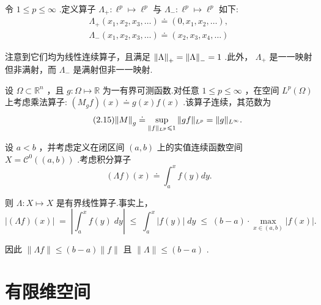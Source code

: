 \begin{instance}
    令 $1 \leq  p \leq  \infty$ .定义算子 ${\Lambda }_{ + } : {\ell }^{p} \mapsto  {\ell }^{p}$ 与 ${\Lambda }_{ - } : {\ell }^{p} \mapsto  {\ell }^{p}$ 如下:
    \begin{gather*}
    {\Lambda }_{ + }\left( {{x}_{1},{x}_{2},{x}_{3},\ldots }\right)  \doteq  \left( {0,{x}_{1},{x}_{2},\ldots }\right),\\
    {\Lambda }_{ - }\left( {{x}_{1},{x}_{2},{x}_{3},\ldots }\right)  \doteq  \left( {{x}_{2},{x}_{3},{x}_{4},\ldots }\right)
    \end{gather*}

注意到它们均为线性连续算子，且满足 $\norm{\Lambda }_{ + } = \norm{\Lambda }_{ - } = 1$ .此外， ${\Lambda }_{ + }$ 是一一映射但非满射，而 ${\Lambda }_{ - }$ 是满射但非一一映射.
\end{instance}
\begin{instance}[乘法算子]
    设 $\Omega  \subset  {\mathbb{R}}^{n}$ ，且 $g : \Omega  \mapsto  \mathbb{R}$ 为一有界可测函数.对任意 $1 \leq  p \leq  \infty$ ，在空间 ${L}^{p}\left( \Omega \right)$ 上考虑乘法算子: $\left( {{M}_{g}f}\right) \left( x\right)  \doteq  g\left( x\right) f\left( x\right)$ .该算子连续，其范数为
\begin{equation}\tag{2.15}
\norm{M}_{g} \doteq  \mathop{\sup }\limits_{{\| f{\| }_{{L}^{p}} \leqslant  1}}\| {gf}{\| }_{{L}^{p}} = \| g{\| }_{{L}^{\infty }}.
\end{equation}
\end{instance}
\begin{instance}[积分算子]
    设 $a < b$ ，并考虑定义在闭区间 $\left(  {a,b}\right)$ 上的实值连续函数空间 $X = {\mathcal{C}}^{0}\left( \left(  {a,b}\right)  \right)$ .考虑积分算子
\[
\left( {\Lambda f}\right) \left( x\right)  \doteq  {\int }_{a}^{x}f\left( y\right) {dy}.
\]

则 $\Lambda  : X \mapsto  X$ 是有界线性算子.事实上，
\[
\left| {\left( {\Lambda f}\right) \left( x\right) }\right| \; = \;\left| {{\int }_{a}^{x}f\left( y\right) \;{dy}}\right| \; \leq  \;{\int }_{a}^{x}\left| {f\left( y\right) }\right| \;{dy}\; \leq  \;\left( {b - a}\right)  \cdot  \mathop{\max }\limits_{{x \in  \left(  {a,b}\right)  }}\left| {f\left( x\right) }\right| .
\]

因此 $\| {\Lambda f}\|  \leq  \left( {b - a}\right) \| f\|$ 且 $\| \Lambda \|  \leq  \left( {b - a}\right)$ .
\end{instance}
\section{有限维空间}

